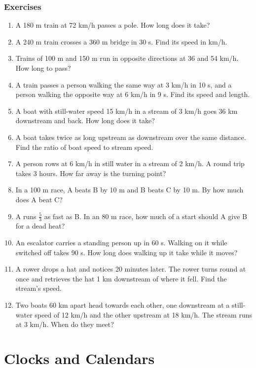 \documentclass[11pt,a4paper,openany]{report}
\newenvironment{exercises}{\subsection*{Exercises \thechapter}\begin{enumerate}[label=\textbf{\thechapter.\arabic*},leftmargin=3.2em]}{\end{enumerate}}
\begin{document}
\begin{exercises}
\item A 180 m train at 72 km/h passes a pole. How long does it take?
\item A 240 m train crosses a 360 m bridge in 30 s. Find its speed in km/h.
\item Trains of 100 m and 150 m run in opposite directions at 36 and 54 km/h. How long to pass?
\item A train passes a person walking the same way at 3 km/h in 10 s, and a person walking the opposite way at 6 km/h in 9 s. Find its speed and length.
\item A boat with still-water speed 15 km/h in a stream of 3 km/h goes 36 km downstream and back. How long does it take?
\item A boat takes twice as long upstream as downstream over the same distance. Find the ratio of boat speed to stream speed.
\item A person rows at 6 km/h in still water in a stream of 2 km/h. A round trip takes 3 hours. How far away is the turning point?
\item In a 100 m race, A beats B by 10 m and B beats C by 10 m. By how much does A beat C?
\item A runs $\frac53$ as fast as B. In an 80 m race, how much of a start should A give B for a dead heat?
\item An escalator carries a standing person up in 60 s. Walking on it while switched off takes 90 s. How long does walking up it take while it moves?
\item A rower drops a hat and notices 20 minutes later. The rower turns round at once and retrieves the hat 1 km downstream of where it fell. Find the stream's speed.
\item Two boats 60 km apart head towards each other, one downstream at a still-water speed of 12 km/h and the other upstream at 18 km/h. The stream runs at 3 km/h. When do they meet?
\end{exercises}

\chapter{Clocks and Calendars}\label{ch:clock}
\end{document}

